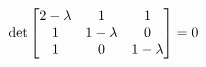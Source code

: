 \documentclass[preview]{standalone}
\begin{document}
\begin{align*}
\special{dvisvgm:raw <g id='unique000'>}\det \begin{bmatrix} 2-\lambda & 1 & 1 \\ 1 & 1-\lambda & 0 \\ 1 & 0 & 1-\lambda \end{bmatrix} = 0\special{dvisvgm:raw </g>}
\end{align*}
\end{document}

